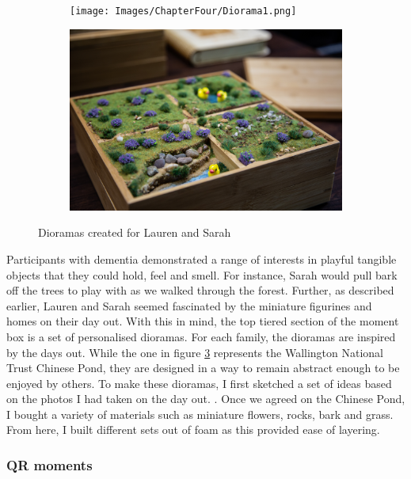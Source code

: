 \begin{figure}[htp]
\centering
\begin{subfigure}{.5\textwidth}
  \centering
  \texttt{[image: Images/ChapterFour/Diorama1.png]}
  \label{fig:DiroamaOne}
\end{subfigure}%
\begin{subfigure}{.5\textwidth}
  \centering
  \includegraphics[width=.8\linewidth]{Images/ChapterFour/Diroama2.png}
  \label{fig:DiroamaTwo}
\end{subfigure}
\caption{Dioramas created for Lauren and Sarah}
\label{fig:Dioramas}
\end{figure}

Participants with dementia demonstrated a range of interests in playful tangible objects that they could hold, feel and smell. For instance, Sarah would pull bark off the trees to play with as we walked through the forest. Further, as described earlier, Lauren and Sarah seemed fascinated by the miniature figurines and homes on their day out. With this in mind, the top tiered section of the moment box is a set of personalised dioramas. For each family, the dioramas are inspired by the days out. While the one in figure \ref{fig:Dioramas} represents the Wallington National Trust Chinese Pond, they are designed in a way to remain abstract enough to be enjoyed by others. To make these dioramas, I first sketched a set of ideas based on the photos I had taken on the day out. . Once we agreed on the Chinese Pond, I bought a variety of materials such as miniature flowers, rocks, bark and grass. From here, I built different sets out of foam as this provided ease of layering.

\subsubsection{QR moments}
\label{QR-Code-Moments}

